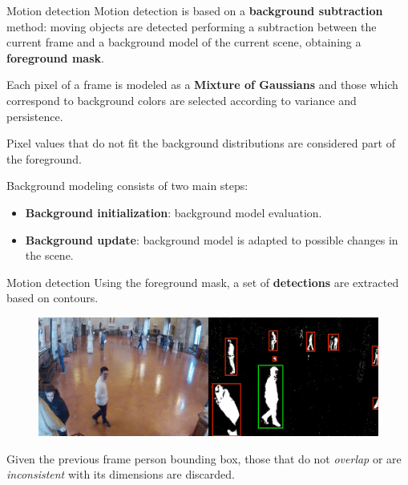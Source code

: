 \documentclass{beamer}
\begin{document}
\begin{tframe}{Motion detection}
Motion detection is based on a \textbf{background subtraction} method: moving objects are detected performing a subtraction between the current frame and a background model of the current scene, obtaining a \textbf{foreground mask}.

\vspace{0.3cm}
Each pixel of a frame is modeled as a \textbf{Mixture of Gaussians} and those which correspond to background colors are selected according to variance and persistence.

Pixel values that do not fit the background distributions are considered part of the foreground.

\vspace{0.2cm}
Background modeling consists of two main steps:
\begin{itemize}
\item \textbf{Background initialization}: background model evaluation.
\item \textbf{Background update}: background model is adapted to possible changes in the scene.
\end{itemize}
\end{tframe}


\begin{tframe}{Motion detection}
Using the foreground mask, a set of \textbf{detections} are extracted based on contours.
\begin{figure}[h]
\centering
\includegraphics[width=1\textwidth]{images/frame_mog.jpg}
\end{figure}

Given the previous frame person bounding box, those that do not \emph{overlap} or are \emph{inconsistent} with its dimensions are discarded.
\end{tframe}
\end{document}
